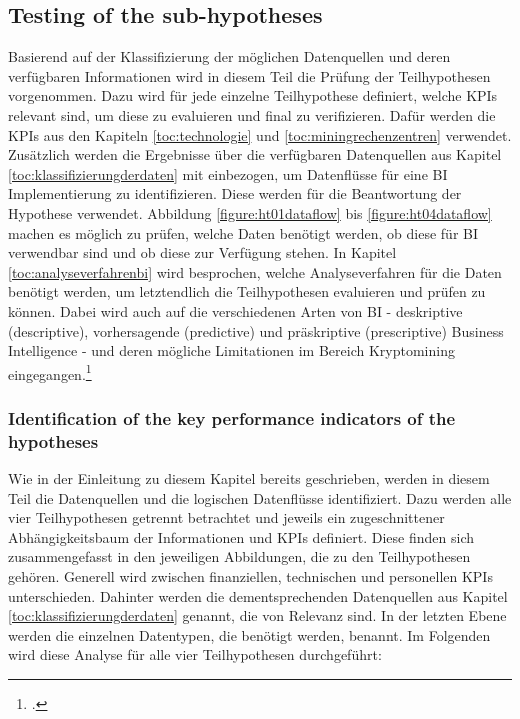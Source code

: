 \subsection{Testing of the sub-hypotheses} \label{toc:pruefungderteilhypothesen}

Basierend auf der Klassifizierung der möglichen Datenquellen und deren verfügbaren Informationen wird in diesem Teil die Prüfung
der Teilhypothesen vorgenommen. Dazu wird für jede einzelne Teilhypothese definiert, welche \acp{KPI} relevant sind, um diese
zu evaluieren und final zu verifizieren. Dafür werden die \acp{KPI} aus den Kapiteln \ref{toc:technologie} und
\ref{toc:miningrechenzentren} verwendet. Zusätzlich werden die Ergebnisse über die verfügbaren Datenquellen aus Kapitel
\ref{toc:klassifizierungderdaten} mit einbezogen, um Datenflüsse für eine \ac{BI} Implementierung zu identifizieren. Diese
werden für die Beantwortung der Hypothese verwendet. Abbildung \ref{figure:ht01dataflow} bis \ref{figure:ht04dataflow} machen
es möglich zu prüfen, welche Daten benötigt werden, ob diese für \ac{BI} verwendbar sind und ob diese zur Verfügung stehen.
In Kapitel \ref{toc:analyseverfahrenbi} wird besprochen, welche Analyseverfahren für die Daten benötigt werden, um letztendlich
die Teilhypothesen evaluieren und prüfen zu können. Dabei wird auch auf die verschiedenen Arten von \ac{BI} - deskriptive
(descriptive), vorhersagende (predictive) und präskriptive (prescriptive) Business Intelligence - und deren mögliche
Limitationen im Bereich Kryptomining eingegangen.\footcite[Cf.][p. 96]{bihani2014comparative}

\subsubsection{Identification of the key performance indicators of the hypotheses} \label{toc:identifikationkpi}

Wie in der Einleitung zu diesem Kapitel bereits geschrieben, werden in diesem Teil die Datenquellen und die logischen Datenflüsse
identifiziert. Dazu werden alle vier Teilhypothesen getrennt betrachtet und jeweils ein zugeschnittener Abhängigkeitsbaum der
Informationen und \acp{KPI} definiert. Diese finden sich zusammengefasst in den jeweiligen Abbildungen, die zu den Teilhypothesen
gehören. Generell wird zwischen finanziellen, technischen und personellen \acp{KPI} unterschieden. Dahinter werden die
dementsprechenden Datenquellen aus Kapitel \ref{toc:klassifizierungderdaten} genannt, die von Relevanz sind. In der letzten Ebene
werden die einzelnen Datentypen, die benötigt werden, benannt. Im Folgenden wird diese Analyse für alle vier Teilhypothesen
durchgeführt:


